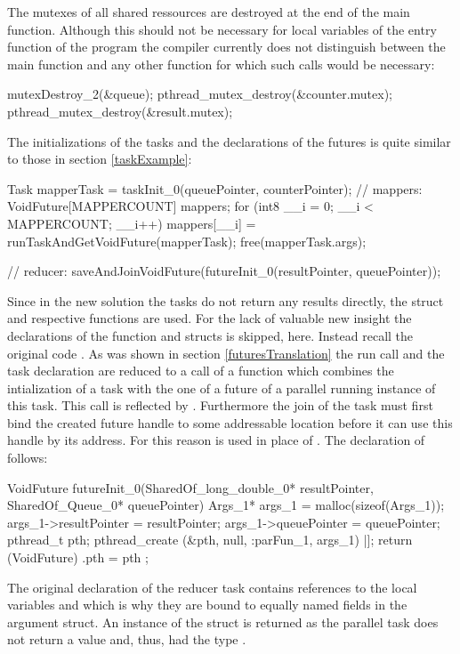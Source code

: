 The mutexes of all shared ressources are destroyed at the end of the main function. Although this should not be necessary for local variables of the entry function of the program the compiler currently does not distinguish between the main function and any other function for which such calls would be necessary:
\begin{ccode}
mutexDestroy_2(&queue); 
pthread_mutex_destroy(&counter.mutex); 
pthread_mutex_destroy(&result.mutex);
\end{ccode}
The initializations of the tasks and the declarations of the futures is quite similar to those in section \ref{taskExample}:
\begin{ccode}
Task mapperTask = taskInit_0(queuePointer, counterPointer);
// mappers:
VoidFuture[MAPPERCOUNT] mappers; 
for (int8 __i = 0; __i < MAPPERCOUNT; __i++) { 
  mappers[__i] = runTaskAndGetVoidFuture(mapperTask); 
}
free(mapperTask.args);

// reducer:
saveAndJoinVoidFuture(futureInit_0(resultPointer, queuePointer));
\end{ccode}

Since in the new solution the tasks do not return any results directly, the  struct and respective functions are used. For the lack of valuable new insight the declarations of the  function and  structs is skipped, here. Instead recall the original code . As was shown in section \ref{futuresTranslation} the run call and the task declaration are reduced to a call of a function which combines the intialization of a task with the one of a future of a parallel running instance of this task. This call is reflected by . Furthermore the join of the task must first bind the created future handle to some addressable location before it can use this handle by its address. For this reason  is used in place of . The declaration of  follows:
\begin{ccode}
VoidFuture futureInit_0(SharedOf_long_double_0* resultPointer, SharedOf_Queue_0* queuePointer) { 
  Args_1* args_1 = malloc(sizeof(Args_1)); 
  args_1->resultPointer = resultPointer; 
  args_1->queuePointer = queuePointer; 
  pthread_t pth; 
  pthread_create (&pth, null, :parFun_1, args_1) |]; 
  return (VoidFuture){ .pth = pth }; 
}
\end{ccode}
The original declaration of the reducer task contains references to the local variables  and  which is why they are bound to equally named fields in the argument struct. An instance of the  struct is returned as the parallel task does not return a value and, thus, had the type .

